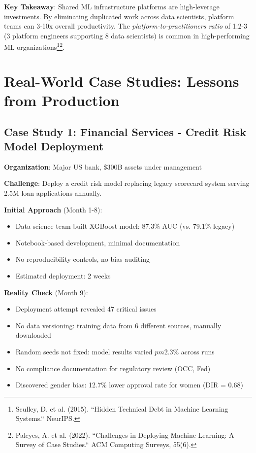 \textbf{Key Takeaway}: Shared ML infrastructure platforms are high-leverage investments. By eliminating duplicated work across data scientists, platform teams can 3-10x overall productivity. The \textit{platform-to-practitioners ratio} of 1:2-3 (3 platform engineers supporting 8 data scientists) is common in high-performing ML organizations\footnote{Sculley, D. et al. (2015). ``Hidden Technical Debt in Machine Learning Systems.`` NeurIPS.}\footnote{Paleyes, A. et al. (2022). ``Challenges in Deploying Machine Learning: A Survey of Case Studies.`` ACM Computing Surveys, 55(6).}.

\section{Real-World Case Studies: Lessons from Production}

\subsection{Case Study 1: Financial Services - Credit Risk Model Deployment}

\textbf{Organization}: Major US bank, \$300B assets under management

\textbf{Challenge}: Deploy a credit risk model replacing legacy scorecard system serving 2.5M loan applications annually.

\textbf{Initial Approach} (Month 1-8):
\begin{itemize}
    \item Data science team built XGBoost model: 87.3\% AUC (vs. 79.1\% legacy)
    \item Notebook-based development, minimal documentation
    \item No reproducibility controls, no bias auditing
    \item Estimated deployment: 2 weeks
\end{itemize}

\textbf{Reality Check} (Month 9):
\begin{itemize}
    \item Deployment attempt revealed 47 critical issues
    \item No data versioning: training data from 6 different sources, manually downloaded
    \item Random seeds not fixed: model results varied $pm$2.3\% across runs
    \item No compliance documentation for regulatory review (OCC, Fed)
    \item Discovered gender bias: 12.7\% lower approval rate for women (DIR = 0.68)
\end{itemize}

